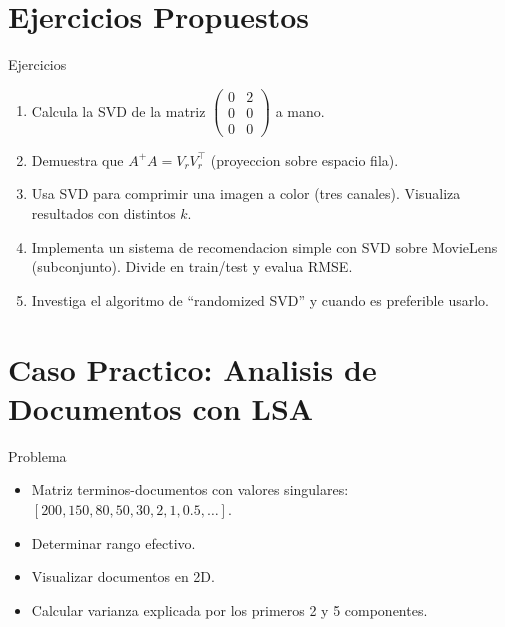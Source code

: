 \documentclass[aspectratio=169, 10pt, xcolor=table]{beamer}
\begin{document}
\section{Ejercicios Propuestos}

\begin{frame}{Ejercicios}
    \begin{enumerate}
        \item Calcula la SVD de la matriz $\begin{pmatrix}0&2\\0&0\\0&0\end{pmatrix}$ a mano.
        \item Demuestra que $A^+A = V_r V_r^\top$ (proyeccion sobre espacio fila).
        \item Usa SVD para comprimir una imagen a color (tres canales). Visualiza resultados con distintos $k$.
        \item Implementa un sistema de recomendacion simple con SVD sobre MovieLens (subconjunto). Divide en train/test y evalua RMSE.
        \item Investiga el algoritmo de ``randomized SVD'' y cuando es preferible usarlo.
    \end{enumerate}
\end{frame}

\section{Caso Practico: Analisis de Documentos con LSA}

\begin{frame}{Problema}
    \begin{itemize}
        \item Matriz terminos-documentos con valores singulares: $[200, 150, 80, 50, 30, 2, 1, 0.5, \dots]$.
        \item Determinar rango efectivo.
        \item Visualizar documentos en 2D.
        \item Calcular varianza explicada por los primeros 2 y 5 componentes.
    \end{itemize}
\end{frame}
\end{document}

